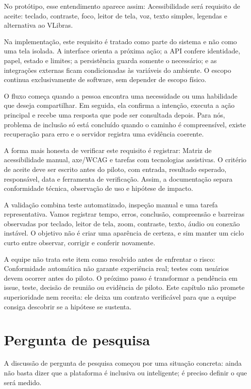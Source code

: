 \documentclass[12pt,oneside,a4paper,article]{abntex2}
\begin{document}
No protótipo, esse entendimento aparece assim: Acessibilidade será requisito de aceite: teclado, contraste, foco, leitor de tela, voz, texto simples, legendas e alternativa ao VLibras.

Na implementação, este requisito é tratado como parte do sistema e não como uma tela isolada. A interface orienta a próxima ação; a API confere identidade, papel, estado e limites; a persistência guarda somente o necessário; e as integrações externas ficam condicionadas às variáveis do ambiente. O escopo continua exclusivamente de software, sem depender de escopo físico.

O fluxo começa quando a pessoa encontra uma necessidade ou uma habilidade que deseja compartilhar. Em seguida, ela confirma a intenção, executa a ação principal e recebe uma resposta que pode ser consultada depois. Para nós, problema de inclusão só está concluído quando o caminho é compreensível, existe recuperação para erro e o servidor registra uma evidência coerente.

A forma mais honesta de verificar este requisito é registrar: Matriz de acessibilidade manual, axe/WCAG e tarefas com tecnologias assistivas. O critério de aceite deve ser escrito antes do piloto, com entrada, resultado esperado, responsável, data e ferramenta de verificação. Assim, a documentação separa conformidade técnica, observação de uso e hipótese de impacto.

A validação combina teste automatizado, inspeção manual e uma tarefa representativa. Vamos registrar tempo, erros, conclusão, compreensão e barreiras observadas por teclado, leitor de tela, zoom, contraste, texto, áudio ou conexão instável. O objetivo não é criar uma aparência de certeza, e sim manter um ciclo curto entre observar, corrigir e conferir novamente.

A equipe não trata este item como resolvido antes de enfrentar o risco: Conformidade automática não garante experiência real; testes com usuários devem ocorrer antes do piloto. O próximo passo é transformar a pendência em issue, teste, decisão de reunião ou evidência de piloto. Este capítulo não promete superioridade nem receita: ele deixa um contrato verificável para que a equipe consiga descobrir se a hipótese se sustenta.

\section{Pergunta de pesquisa}
A discussão de pergunta de pesquisa começou por uma situação concreta: ainda não basta dizer que a plataforma é inclusiva ou inteligente; é preciso definir o que será medido.
\end{document}
